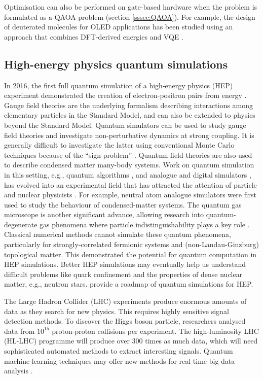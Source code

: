 \documentclass[10pt]{iopart}
\begin{document}
Optimisation can also be performed on gate-based hardware when the problem is formulated as a QAOA problem (section \ref{sssec:QAOA}). For example, the design of deuterated molecules for OLED applications has been studied using an approach that combines DFT-derived energies and VQE \cite{Gao2023}. 

\subsection{High-energy physics quantum simulations}

In 2016, the first full quantum simulation of a high-energy physics (HEP) experiment demonstrated the creation of electron-positron pairs from energy \cite{Martinez2016}. 
Gauge field theories are the underlying formalism describing interactions among elementary particles in the Standard Model, and can also be extended to physics beyond the Standard Model. Quantum simulators can be used to study gauge field theories and investigate non-perturbative dynamics at strong coupling. It is generally difficult to investigate the latter using conventional Monte Carlo techniques because of the ``sign problem'' \cite{Alexandru2022}. 
Quantum field theories are also used to describe condensed matter many-body systems.  Work on quantum simulation in this setting, e.g.,
quantum algorithms \cite{Byrnes2006}, and analogue \cite{Zohar2011} and digital simulators \cite{Buchler2005}, has evolved into an experimental field that has attracted the attention of particle and nuclear physicists \cite{Cloet2019,Bauer2023}. 
For example, neutral atom analogue simulators were first used to study the behaviour of condensed-matter systems. The quantum gas microscope is another significant advance, allowing research into quantum-degenerate gas phenomena where particle indistinguishability plays a key role \cite{Bakr2009,Cheuk2015}. Classical numerical methods cannot simulate these quantum phenomena, particularly for strongly-correlated fermionic systems and (non-Landau-Ginzburg) topological matter.  This demonstrated the potential for quantum computation in HEP simulations.
Better HEP simulations may eventually help us understand difficult problems like quark confinement and the properties of dense nuclear matter, e.g., neutron stars. 
\citeauthor{Bauer2023} \cite{Bauer2023} provide a roadmap of quantum simulations for HEP. 

The Large Hadron Collider (LHC) experiments produce enormous amounts of data as they search for new physics. This requires highly sensitive signal detection methods. To discover the Higgs boson particle, researchers analysed data from $10^{15}$ proton-proton collisions per experiment. The high-luminosity LHC (HL-LHC) programme will produce over 300 times as much data, which will need sophisticated automated methods to extract interesting signals. Quantum machine learning techniques may offer new methods for real time big data analysis \cite{Wu2022}. 
\end{document}
